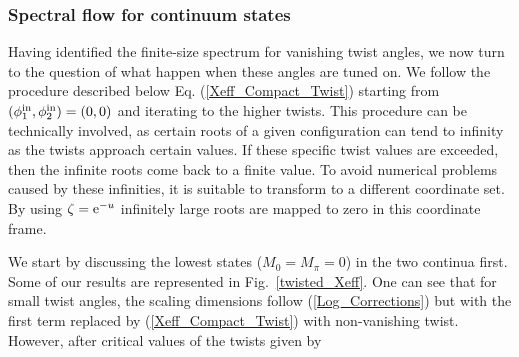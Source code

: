 \documentclass[12pt]{article}
\numberwithin{equation}{section}
\newcommand{\re}{{\rm e}}
\begin{document}
	\subsubsection{Spectral flow for continuum states}
	
	Having identified the finite-size spectrum for vanishing twist angles, we now turn to the question of what happen when these angles are tuned on. We follow the procedure described below Eq.  (\ref{Xeff_Compact_Twist}) starting from $(\phi^{ \rm{in}}_1,\phi^{ \rm{in}}_{2})=(0,0)$ and iterating to the higher twists. This procedure can be technically involved, as certain roots of a given configuration can tend to infinity as the twists approach certain values. If these specific twist values are exceeded, then the infinite roots come back to a finite value. To avoid numerical problems caused by these infinities, it is suitable to transform to a different coordinate set. By using $\zeta=\re^{-u}$ infinitely large roots are mapped to zero in this coordinate frame. 
	
	We start by discussing the lowest states ($M_0=M_\pi=0$) in the two continua first. 
	Some of our results are represented in Fig.~\ref{twisted_Xeff}. One can see that for small twist angles, the scaling dimensions follow  (\ref{Log_Corrections}) but with the first term replaced by (\ref{Xeff_Compact_Twist}) with non-vanishing twist. However, after critical values of the twists given by 
	
\end{document}
